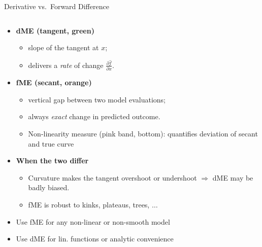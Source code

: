 \documentclass[10pt,compress,t,notes=noshow, xcolor=table]{beamer}
\begin{document}


\begin{frame}{Derivative vs.\ Forward Difference}

\begin{columns}[T,onlytextwidth]
\begin{column}{0.67\textwidth}
\begin{itemize}%
  \item \textbf{dME (tangent, green)}
        \begin{itemize}
            \item slope of the tangent at \(x\);
            \item delivers a \emph{rate} of change \(\tfrac{\partial\widehat f}{\partial x}\).
        \end{itemize}
  \item \textbf{fME (secant, orange)}
        \begin{itemize}
            \item vertical gap between two model evaluations;
            \item always \emph{exact} change in predicted outcome.
            \item Non-linearity measure (pink band, bottom): quantifies deviation of secant and true curve 
        \end{itemize}

  \item \textbf{When the two differ}
        \begin{itemize}
            \item Curvature makes the tangent overshoot or undershoot  
                  \(\Rightarrow\) dME may be badly biased.
            \item fME is robust to kinks, plateaus, trees, $\dots$
        \end{itemize}
    \item<2-> Use fME for any non-linear or non-smooth model
    \item<2-> Use dME for lin. functions or analytic convenience
\end{itemize}


\end{column}
\end{columns}
\end{frame}
\end{document}
